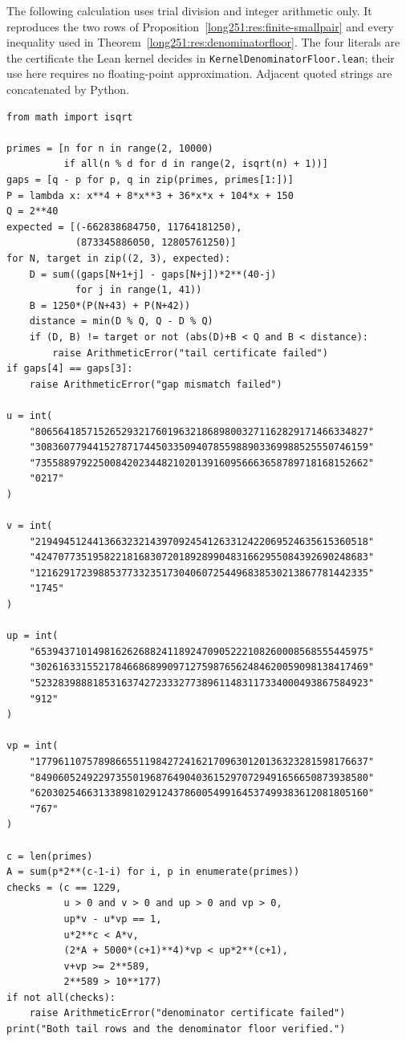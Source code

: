 The following calculation uses trial division and integer arithmetic only.  It
reproduces the two rows of Proposition~\ref{long251:res:finite-smallpair} and every
inequality used in Theorem~\ref{long251:res:denominatorfloor}.  The four literals are
the certificate the Lean kernel decides in
\texttt{KernelDenominatorFloor.lean}; their use here requires no
floating-point approximation.  Adjacent quoted strings are concatenated by
Python.
{\footnotesize
\begin{verbatim}
from math import isqrt

primes = [n for n in range(2, 10000)
          if all(n % d for d in range(2, isqrt(n) + 1))]
gaps = [q - p for p, q in zip(primes, primes[1:])]
P = lambda x: x**4 + 8*x**3 + 36*x*x + 104*x + 150
Q = 2**40
expected = [(-662838684750, 11764181250),
            (873345886050, 12805761250)]
for N, target in zip((2, 3), expected):
    D = sum((gaps[N+1+j] - gaps[N+j])*2**(40-j)
            for j in range(1, 41))
    B = 1250*(P(N+43) + P(N+42))
    distance = min(D % Q, Q - D % Q)
    if (D, B) != target or not (abs(D)+B < Q and B < distance):
        raise ArithmeticError("tail certificate failed")
if gaps[4] == gaps[3]:
    raise ArithmeticError("gap mismatch failed")

u = int(
    "8065641857152652932176019632186898003271162829171466334827"
    "3083607794415278717445033509407855988903369988525550746159"
    "7355889792250084202344821020139160956663658789718168152662"
    "0217"
)

v = int(
    "2194945124413663232143970924541263312422069524635615360518"
    "4247077351958221816830720189289904831662955084392690248683"
    "1216291723988537733235173040607254496838530213867781442335"
    "1745"
)

up = int(
    "6539437101498162626882411892470905222108260008568555445975"
    "3026163315521784668689909712759876562484620059098138417469"
    "5232839888185316374272333277389611483117334000493867584923"
    "912"
)

vp = int(
    "1779611075789866551198427241621709630120136323281598176637"
    "8490605249229735501968764904036152970729491656650873938580"
    "6203025466313389810291243786005499164537499383612081805160"
    "767"
)

c = len(primes)
A = sum(p*2**(c-1-i) for i, p in enumerate(primes))
checks = (c == 1229,
          u > 0 and v > 0 and up > 0 and vp > 0,
          up*v - u*vp == 1,
          u*2**c < A*v,
          (2*A + 5000*(c+1)**4)*vp < up*2**(c+1),
          v+vp >= 2**589,
          2**589 > 10**177)
if not all(checks):
    raise ArithmeticError("denominator certificate failed")
print("Both tail rows and the denominator floor verified.")
\end{verbatim}
}

